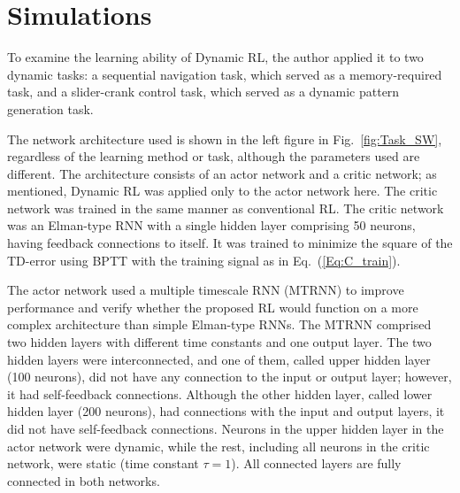 \section{Simulations}
To examine the learning ability of Dynamic RL, the author applied it to two dynamic tasks:
a sequential navigation task, which served as a memory-required task, and a slider-crank control task,
which served as a dynamic pattern generation task.

The network architecture used is shown in the left figure in Fig.~\ref{fig:Task_SW},
regardless of the learning method or task, although the parameters used are different.
The architecture consists of an actor network and a critic network;
as mentioned, Dynamic RL was applied only to the actor network here.
The critic network was trained in the same manner as conventional RL.
The critic network was an Elman-type RNN with a single hidden layer comprising 50 neurons, having feedback connections to itself.
It was trained to minimize the square of the TD-error using BPTT
with the training signal as in Eq.~(\ref{Eq:C_train}).

The actor network used a multiple timescale RNN (MTRNN) \citep{MTRNN}
to improve performance and verify whether the proposed RL would function
on a more complex architecture than simple Elman-type RNNs.
The MTRNN comprised two hidden layers with different time constants and one output layer.
The two hidden layers were interconnected, and one of them, called upper hidden layer (100 neurons),
did not have any connection to the input or output layer; however, it had self-feedback connections.
Although the other hidden layer, called lower hidden layer (200 neurons), had connections with the input and output layers,
it did not have self-feedback connections.
Neurons in the upper hidden layer in the actor network were dynamic,
while the rest, including all neurons in the critic network, were static (time constant $\tau=1$).
All connected layers are fully connected in both networks.

